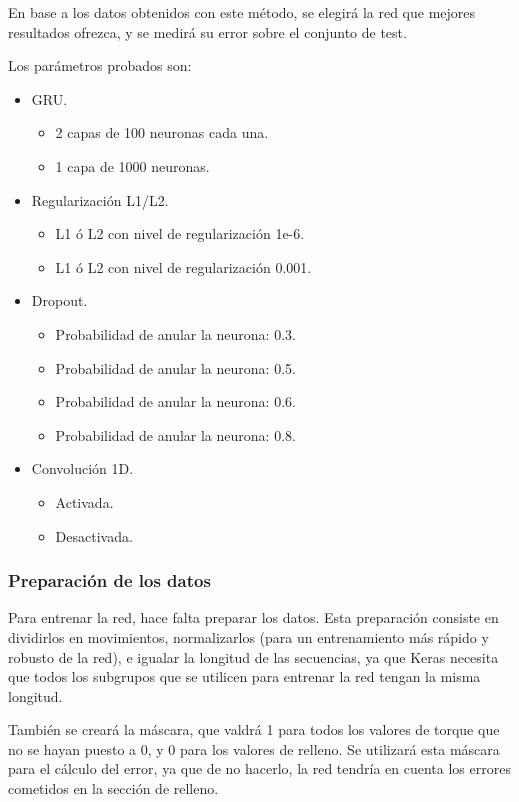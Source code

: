 En base a los datos obtenidos con este método, se elegirá la red que mejores resultados ofrezca, y se medirá su error sobre el conjunto de test.

Los parámetros probados son:

\begin{itemize}
	\item GRU.
	\begin{itemize}
		\item 2 capas de 100 neuronas cada una.
		\item 1 capa de 1000 neuronas.
	\end{itemize}
	\item Regularización L1/L2.
	\begin{itemize}
		\item L1 ó L2 con nivel de regularización 1e-6.
		\item L1 ó L2 con nivel de regularización 0.001.
	\end{itemize}
	\item Dropout.
	\begin{itemize}
		\item Probabilidad de anular la neurona: 0.3.
		\item Probabilidad de anular la neurona: 0.5.
		\item Probabilidad de anular la neurona: 0.6.
		\item Probabilidad de anular la neurona: 0.8.
	\end{itemize}
	\item Convolución 1D.
	\begin{itemize}
		\item Activada.
		\item Desactivada.
	\end{itemize}
\end{itemize}
\subsubsection{Preparación de los datos}
Para entrenar la red, hace falta preparar los datos. Esta preparación consiste en dividirlos  en movimientos, normalizarlos (para un entrenamiento más rápido y robusto de la red), e igualar la longitud de las secuencias, ya que Keras necesita que todos los subgrupos que se utilicen para entrenar la red tengan la misma longitud.

También se creará la máscara, que valdrá 1 para todos los valores de torque que no se hayan puesto a 0, y 0 para los valores de relleno. Se utilizará esta máscara para el cálculo del error, ya que de no hacerlo, la red tendría en cuenta los errores cometidos en la sección de relleno.

